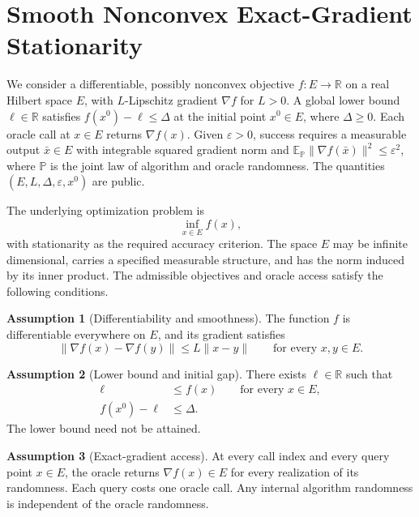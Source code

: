 \documentclass[10pt]{article}
\theoremstyle{definition}
\newtheorem{assumption}{Assumption}
\begin{document}
\section*{Smooth Nonconvex Exact-Gradient Stationarity}
We consider a differentiable, possibly nonconvex objective $f:E\to\mathbb{R}$ on a real Hilbert space $E$, with $L$-Lipschitz gradient $\nabla f$ for $L>0$. A global lower bound $\ell\in\mathbb{R}$ satisfies $f(x^0)-\ell\leq\Delta$ at the initial point $x^0\in E$, where $\Delta\geq0$. Each oracle call at $x\in E$ returns $\nabla f(x)$. Given $\varepsilon>0$, success requires a measurable output $\bar{x}\in E$ with integrable squared gradient norm and $\mathbb{E}_{\mathbb{P}}\|\nabla f(\bar{x})\|^2\leq\varepsilon^2$, where $\mathbb{P}$ is the joint law of algorithm and oracle randomness. The quantities $(E,L,\Delta,\varepsilon,x^0)$ are public.

The underlying optimization problem is
\begin{equation}
\label{eq:problem}
\inf_{x\in E} f(x),
\end{equation}
with stationarity as the required accuracy criterion. The space $E$ may be infinite dimensional, carries a specified measurable structure, and has the norm induced by its inner product. The admissible objectives and oracle access satisfy the following conditions.

\begin{assumption}[Differentiability and smoothness]
The function $f$ is differentiable everywhere on $E$, and its gradient satisfies
\begin{equation}
\|\nabla f(x)-\nabla f(y)\|\leq L\|x-y\|
\qquad\text{for every }x,y\in E.
\end{equation}
\end{assumption}

\begin{assumption}[Lower bound and initial gap]
There exists $\ell\in\mathbb{R}$ such that
\begin{align}
\ell &\leq f(x) \qquad\text{for every }x\in E,\\
f(x^0)-\ell &\leq\Delta.
\end{align}
The lower bound need not be attained.
\end{assumption}

\begin{assumption}[Exact-gradient access]
At every call index and every query point $x\in E$, the oracle returns $\nabla f(x)\in E$ for every realization of its randomness. Each query costs one oracle call. Any internal algorithm randomness is independent of the oracle randomness.
\end{assumption}
\end{document}
